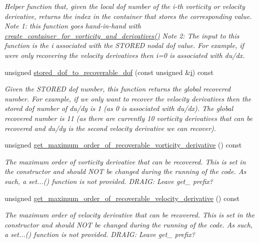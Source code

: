 \begin{DoxyCompactItemize}
\begin{DoxyCompactList}\small\item\em Helper function that, given the local dof number of the i-\/th vorticity or velocity derivative, returns the index in the container that stores the corresponding value. Note 1\+: this function goes hand-\/in-\/hand with \hyperlink{classoomph_1_1VorticitySmootherElement_a84300b8d30090a7275a1e0233546b683}{create\+\_\+container\+\_\+for\+\_\+vorticity\+\_\+and\+\_\+derivatives()} Note 2\+: The input to this function is the i associated with the S\+T\+O\+R\+ED nodal dof value. For example, if we\textquotesingle{}re only recovering the velocity derivatives then i=0 is associated with du/dx. \end{DoxyCompactList}\item 
unsigned \hyperlink{classoomph_1_1VorticitySmootherElement_aa0c9c94ce5dafa63f243511be306a237}{stored\+\_\+dof\+\_\+to\+\_\+recoverable\+\_\+dof} (const unsigned \&\hyperlink{cfortran_8h_adb50e893b86b3e55e751a42eab3cba82}{i}) const
\begin{DoxyCompactList}\small\item\em Given the S\+T\+O\+R\+ED dof number, this function returns the global recovered number. For example, if we only want to recover the velocity derivatives then the stored dof number of du/dy is 1 (as 0 is associated with du/dx). The global recovered number is 11 (as there are currently 10 vorticity derivatives that can be recovered and du/dy is the second velocity derivative we can recover). \end{DoxyCompactList}\item 
unsigned \hyperlink{classoomph_1_1VorticitySmootherElement_a752d6be1a14a39f1c66ce09769bd075d}{get\+\_\+maximum\+\_\+order\+\_\+of\+\_\+recoverable\+\_\+vorticity\+\_\+derivative} () const
\begin{DoxyCompactList}\small\item\em The maximum order of vorticity derivative that can be recovered. This is set in the constructor and should N\+OT be changed during the running of the code. As such, a set...() function is not provided. D\+R\+A\+IG\+: Leave get\+\_\+ prefix? \end{DoxyCompactList}\item 
unsigned \hyperlink{classoomph_1_1VorticitySmootherElement_ab4a59ee60f1d6591594fe9d7169f75bc}{get\+\_\+maximum\+\_\+order\+\_\+of\+\_\+recoverable\+\_\+velocity\+\_\+derivative} () const
\begin{DoxyCompactList}\small\item\em The maximum order of velocity derivative that can be recovered. This is set in the constructor and should N\+OT be changed during the running of the code. As such, a set...() function is not provided. D\+R\+A\+IG\+: Leave get\+\_\+ prefix? \end{DoxyCompactList}\item 

\end{DoxyCompactItemize}
